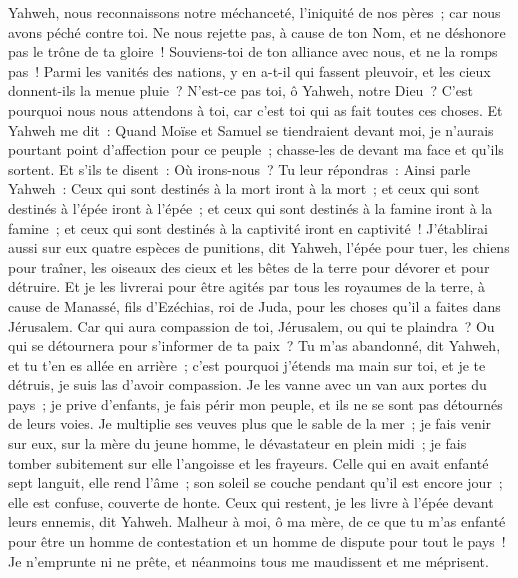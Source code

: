 \begin{multicols}{2}
Yahweh, nous reconnaissons notre méchanceté, l'iniquité de nos pères~; car nous avons péché contre toi.
Ne nous rejette pas, à cause de ton Nom, et ne déshonore pas le trône de ta gloire~! Souviens-toi de ton alliance avec nous, et ne la romps pas~!
Parmi les vanités des nations, y en a-t-il qui fassent pleuvoir, et les cieux donnent-ils la menue pluie~? N'est-ce pas toi, ô Yahweh, notre Dieu~? C'est pourquoi nous nous attendons à toi, car c'est toi qui as fait toutes ces choses.
\VerseOne{}Et Yahweh me dit~: Quand Moïse et Samuel se tiendraient devant moi, je n'aurais pourtant point d'affection pour ce peuple~; chasse-les de devant ma face et qu'ils sortent.
Et s'ils te disent~: Où irons-nous~? Tu leur répondras~: Ainsi parle Yahweh~: Ceux qui sont destinés à la mort iront à la mort~; et ceux qui sont destinés à l'épée iront à l'épée~; et ceux qui sont destinés à la famine iront à la famine~; et ceux qui sont destinés à la captivité iront en captivité~!
J'établirai aussi sur eux quatre espèces de punitions, dit Yahweh, l'épée pour tuer, les chiens pour traîner, les oiseaux des cieux et les bêtes de la terre pour dévorer et pour détruire.
Et je les livrerai pour être agités par tous les royaumes de la terre, à cause de Manassé, fils d'Ezéchias, roi de Juda, pour les choses qu'il a faites dans Jérusalem.
Car qui aura compassion de toi, Jérusalem, ou qui te plaindra~? Ou qui se détournera pour s'informer de ta paix~?
Tu m'as abandonné, dit Yahweh, et tu t'en es allée en arrière~; c'est pourquoi j'étends ma main sur toi, et je te détruis, je suis las d'avoir compassion.
Je les vanne avec un van aux portes du pays~; je prive d'enfants, je fais périr mon peuple, et ils ne se sont pas détournés de leurs voies.
Je multiplie ses veuves plus que le sable de la mer~; je fais venir sur eux, sur la mère du jeune homme, le dévastateur en plein midi~; je fais tomber subitement sur elle l'angoisse et les frayeurs.
Celle qui en avait enfanté sept languit, elle rend l'âme~; son soleil se couche pendant qu'il est encore jour~; elle est confuse, couverte de honte. Ceux qui restent, je les livre à l'épée devant leurs ennemis, dit Yahweh.
Malheur à moi, ô ma mère, de ce que tu m'as enfanté pour être un homme de contestation et un homme de dispute pour tout le pays~! Je n'emprunte ni ne prête, et néanmoins tous me maudissent et me méprisent.

\end{multicols}
